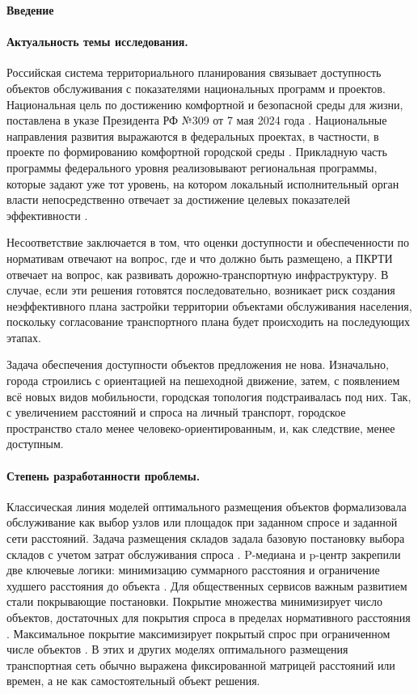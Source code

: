 \documentclass[14pt,a4paper]{extarticle}
\begin{document}
\begin{center}
\textbf{Введение}
\end{center}

\paragraph*{Актуальность темы исследования.}

Российская система территориального планирования связывает доступность объектов обслуживания с показателями национальных программ и проектов. Национальная цель по достижению комфортной и безопасной среды для жизни, поставлена в указе Президента РФ №309 от 7 мая 2024 года \cite{rfDecree309_2024}. Национальные направления развития выражаются в федеральных проектах, в частности, в проекте по формированию комфортной городской среды \cite{federalProjectFkgsPassport}. Прикладную часть программы федерального уровня реализовывают региональная программы, которые задают уже тот уровень, на котором локальный исполнительный орган власти непосредственно отвечает за достижение целевых показателей  эффективности \cite{spbRegionalFkgs}.

Несоответствие заключается в том, что оценки доступности и обеспеченности по нормативам отвечают на вопрос, где и что должно быть размещено, а ПКРТИ отвечает на вопрос, как развивать дорожно-транспортную инфраструктуру. В случае, если эти решения готовятся последовательно, возникает риск создания неэффективного плана застройки территории объектами обслуживания населения, поскольку согласование транспортного плана будет происходить на последующих этапах.

Задача обеспечения доступности объектов предложения не нова. Изначально, города строились с ориентацией на пешеходной движение, затем, с появлением всё новых видов мобильности, городская топология подстраивалась под них. Так, с увеличением расстояний и спроса на личный транспорт, городское пространство стало менее человеко-ориентированным, и, как следствие, менее доступным.

\paragraph*{Степень разработанности проблемы.}

Классическая линия моделей оптимального размещения объектов формализовала обслуживание как выбор узлов или площадок при заданном спросе и заданной сети расстояний. Задача размещения складов задала базовую постановку выбора складов с учетом затрат обслуживания спроса \cite{kuehn1963warehouse}. P-медиана и p-центр закрепили две ключевые логики: минимизацию суммарного расстояния и ограничение худшего расстояния до объекта \cite{hakimi1964medians}. Для общественных сервисов важным развитием стали покрывающие постановки. Покрытие множества минимизирует число объектов, достаточных для покрытия спроса в пределах нормативного расстояния \cite{toregas1971emergency}. Максимальное покрытие максимизирует покрытый спрос при ограниченном числе объектов \cite{church1974mclp}. В этих и других моделях оптимального размещения транспортная сеть обычно выражена фиксированной матрицей расстояний или времен, а не как самостоятельный объект решения.
\end{document}
